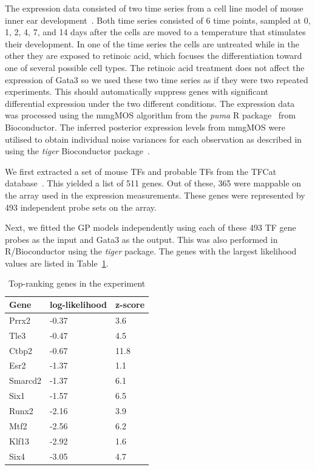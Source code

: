 \documentclass{article}
\begin{document}
The expression data consisted of two time series from a cell line
model of mouse inner ear development~\cite{Helyer2007}.  Both time series
consisted of 6 time points, sampled at 0, 1, 2, 4, 7, and 14 days
after the cells are moved to a temperature that stimulates their
development.  In one of the time series the cells are untreated while
in the other they are exposed to retinoic acid, which focuses the
differentiation toward one of several possible cell types.  The
retinoic acid treatment does not affect the expression of Gata3 so we
used these two time series as if they were two repeated experiments.
This should automatically suppress genes with significant differential
expression under the two different conditions.  The expression data
was processed using the mmgMOS algorithm from the \emph{puma} R
package~\cite{Liu:tractable04,Pearson:puma09} from Bioconductor.  The
inferred posterior expression levels from mmgMOS were utilised to
obtain individual noise variances for each observation as described
in~\cite{Honkela:modelbased10} using the \emph{tiger} Bioconductor
package~\cite{Honkela:tigerpackage10}.

We first extracted a set of mouse TFs and probable TFs from the TFCat
database~\cite{Fulton2009}.  This yielded a list of 511 genes.  Out of
these, 365 were mappable on the array used in the expression
measurements.  These genes were represented by 493 independent probe
sets on the array.

Next, we fitted the GP models independently using each of these 493 TF
gene probes as the input and Gata3 as the output.  This was also
performed in R/Bioconductor using the \emph{tiger} package.  The genes
with the largest likelihood values are listed in
Table~\ref{tab:results}.

\begin{table}[htb]
  \centering
  \begin{tabular}{lll}
    Gene & log-likelihood & z-score \\
    \hline
    Prrx2 & -0.37 & 3.6 \\
    Tle3 & -0.47 & 4.5 \\
    Ctbp2 & -0.67 & 11.8 \\
    Esr2 & -1.37 & 1.1 \\
    Smarcd2 & -1.37 & 6.1 \\
    Six1 & -1.57 & 6.5 \\
    Runx2 & -2.16 & 3.9 \\
    Mtf2 & -2.56 & 6.2 \\
    Klf13 & -2.92 & 1.6 \\
    Six4 & -3.05 & 4.7 \\
  \end{tabular}
  \caption{Top-ranking genes in the experiment}
  \label{tab:results}
\end{table}
\end{document}
